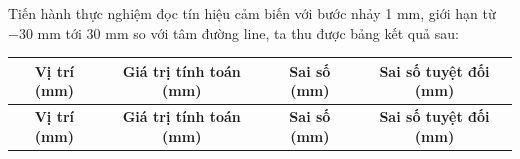             \hspace*{0.6cm}Tiến hành thực nghiệm đọc tín hiệu cảm biến với bước nhảy 1 mm, giới hạn từ $-30$ mm tới $30$ mm so với tâm đường line, ta thu được bảng kết quả sau:
        
            \begin{longtable}{|c|c|c|c|}
                \hline
                \textbf{Vị trí (mm)} & \textbf{Giá trị tính toán (mm)} & \textbf{Sai số (mm)} & \textbf{Sai số tuyệt đối (mm)} \\
                \hline
                \endfirsthead
                
                \hline
                \textbf{Vị trí (mm)} & \textbf{Giá trị tính toán (mm)} & \textbf{Sai số (mm)} & \textbf{Sai số tuyệt đối (mm)} \\
                \hline
                \endhead


\end{longtable}
